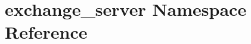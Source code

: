 \hypertarget{namespaceexchange__server}{}\section{exchange\+\_\+server Namespace Reference}
\label{namespaceexchange__server}
